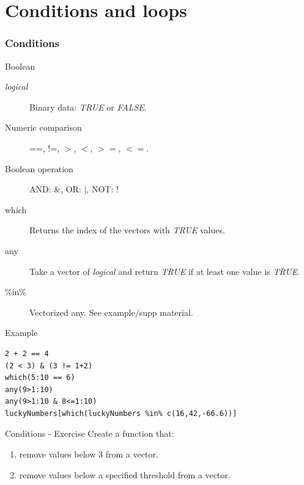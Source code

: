 \documentclass[10pt]{beamer}
\newenvironment{xframe}[2][]
  {\begin{frame}[fragile,environment=xframe,#1]
  \frametitle{#2}}
  {\end{frame}}
\begin{document}


\section{Conditions and loops}
\begin{xframe}{Conditions}
  \begin{block}{Boolean}
    \begin{description}
    \item[{\it logical}] Binary data: {\it TRUE} or {\it FALSE}.
    \item[Numeric comparison] {\sf ==}, {\sf !=}, {\sf $>$}, {\sf $<$}, {\sf $>=$}, {\sf $<=$}.
    \item[Boolean operation] AND: \&, OR: $|$, NOT: !
    \item[which] Returns the index of the vectors with {\it TRUE} values.
    \item[any] Take a vector of {\it logical} and return {\it TRUE} if at least one value is {\it TRUE}.
    \item[\%in\%] Vectorized any. See example/supp material.
    \end{description}
  \end{block}
  \begin{exampleblock}{Example}
\begin{verbatim}
2 + 2 == 4
(2 < 3) & (3 != 1+2)
which(5:10 == 6)
any(9>1:10)
any(9>1:10 & 8<=1:10)
luckyNumbers[which(luckyNumbers %in% c(16,42,-66.6))]
\end{verbatim}  
  \end{exampleblock}
\end{xframe}


\begin{frame}{Conditions - Exercise}
  Create a function that: 
  \begin{enumerate}
  \item remove values below $3$ from a vector.
  \item  remove values below a specified threshold from a vector.
  \end{enumerate}
\end{frame}
\end{document}
